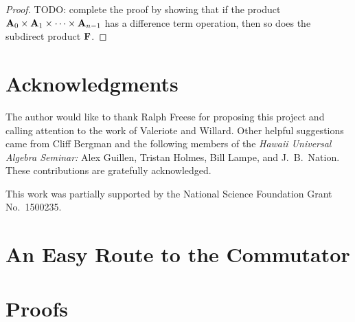 \begin{proof}
  \medskip

  \noindent TODO: complete the proof by showing that if the product 
  $\mathbf{A}_0 \times \mathbf{A}_1 \times \cdots \times \mathbf{A}_{n-1}$ has a difference term operation,
  then so does the subdirect product $\mathbf{F}$.
\end{proof}


\section*{Acknowledgments}
The author would like to thank
Ralph Freese for proposing this project and calling attention to
the work of Valeriote and Willard.
Other helpful suggestions came from Cliff Bergman and the
following members of the {\it Hawaii Universal Algebra 
Seminar:} Alex Guillen, Tristan Holmes, Bill Lampe, and J.~B.~Nation.
These contributions are gratefully acknowledged.

This work was partially supported by the National Science 
Foundation Grant No.~1500235.



\appendix



\section{An Easy Route to the Commutator}
\label{sec:interlude:-an-easy}





\section{Proofs}
\label{sec:proofs}

